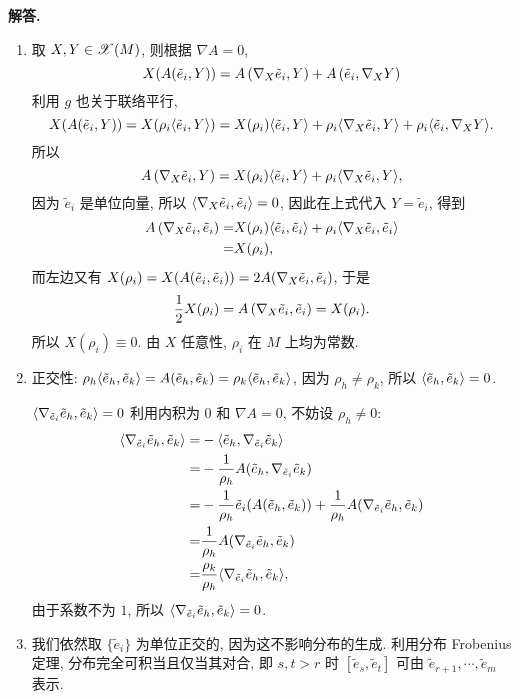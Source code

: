 \documentclass{ctexart}
\newenvironment{solution}{\par\noindent\textbf{解答. }}{\par}
\begin{document}
\begin{solution}
    \begin{enumerate}
        \item 取 $X, Y \in \mathscr{X}(M)$, 则根据 $\nabla A = 0$,
        \[
            X(A(\tilde{e}_i, Y))
            = A\left(\nabla_{X}\tilde{e}_i, Y\right) + A\left(\tilde{e}_i, \nabla_{X}{Y}\right)
        \]
        利用 $g$ 也关于联络平行,
        \[
            X(A(\tilde{e}_i, Y)) = X(\rho_i\langle {\tilde{e}_i}, {Y} \rangle)
            = X(\rho_i)\langle {\tilde{e}_i}, {Y} \rangle + \rho_i\langle {\nabla_{X}\tilde{e}_i}, {Y} \rangle + \rho_i\langle {\tilde{e}_i}, {\nabla_{X}{Y}} \rangle.
        \]
        所以
        \[
            A\left(\nabla_{X}\tilde{e}_i, Y\right) = X(\rho_i)\langle {\tilde{e}_i}, {Y} \rangle + \rho_i\langle {\nabla_{X}\tilde{e}_i}, {Y} \rangle,
        \]
        因为 $\tilde{e}_i$ 是单位向量, 所以 $\langle {\nabla_{X}\tilde{e}_i}, {\tilde{e}_i} \rangle = 0$, 因此在上式代入 $Y = \tilde{e}_i$, 得到
        \[
            \begin{aligned}
            A\left(\nabla_{X}\tilde{e}_i, \tilde{e}_i\right) 
            =& X(\rho_i)\langle {\tilde{e}_i}, {\tilde{e}_i} \rangle + \rho_i\langle {\nabla_{X}\tilde{e}_i}, {\tilde{e}_i} \rangle \\
            =& X(\rho_i),
            \end{aligned}
        \]
        而左边又有 $X(\rho_i) = X(A(\tilde{e}_i, \tilde{e}_i)) = 2A(\nabla_{X}\tilde{e}_i, \tilde{e}_i)$, 于是
        \[
            \frac{1}{2}X(\rho_i) = A\left(\nabla_{X}\tilde{e}_i, \tilde{e}_i\right) = X(\rho_i).
        \]
        所以 $X(\rho_i) \equiv 0$. 由 $X$ 任意性, $\rho_i$ 在 $M$ 上均为常数.
        
        \item 正交性: $\rho_h\langle {\tilde{e}_h}, {\tilde{e}_k} \rangle = A(\tilde{e}_h, \tilde{e}_k) = \rho_k\langle {\tilde{e}_h}, {\tilde{e}_k} \rangle$, 因为 $\rho_h \not= \rho_k$, 所以 $\langle {\tilde{e}_h}, {\tilde{e}_k} \rangle = 0$. 
        
        $\langle {\nabla_{\tilde{e}_i}\tilde{e}_h}, {\tilde{e}_k} \rangle = 0$ 利用内积为 $0$ 和 $\nabla A = 0$, 不妨设 $\rho_h \not= 0$:
        \[
            \begin{aligned}
            \langle {\nabla_{\tilde{e}_i}\tilde{e}_h}, {\tilde{e}_k} \rangle 
            =& -\langle {\tilde{e}_h}, {\nabla_{\tilde{e}_i}\tilde{e}_k} \rangle\\
            =& -\frac{1}{\rho_h}A(\tilde{e}_h, \nabla_{\tilde{e}_i}\tilde{e}_k)\\
            =& -\frac{1}{\rho_h}\tilde{e}_i(A(\tilde{e}_h, \tilde{e}_k)) + \frac{1}{\rho_h}A(\nabla_{\tilde{e}_i}\tilde{e}_h, \tilde{e}_k)\\
            =& \frac{1}{\rho_h}A(\nabla_{\tilde{e}_i}\tilde{e}_h, \tilde{e}_k) \\
            =& \frac{\rho_k}{\rho_h}\langle {\nabla_{\tilde{e}_i}\tilde{e}_h}, {\tilde{e}_k} \rangle,
            \end{aligned}
        \]
        由于系数不为 $1$, 所以 $\langle {\nabla_{\tilde{e}_i}\tilde{e}_h}, {\tilde{e}_k} \rangle = 0$.
        \item 我们依然取 $\{\tilde{e}_i\}$ 为单位正交的, 因为这不影响分布的生成. 利用分布 Frobenius 定理, 分布完全可积当且仅当其对合, 即 $s, t > r$ 时 $[\tilde{e}_s, \tilde{e}_t]$ 可由 $\tilde{e}_{r + 1}, \cdots, \tilde{e}_{m}$ 表示. 
        

\end{enumerate}
\end{solution}
\end{document}
